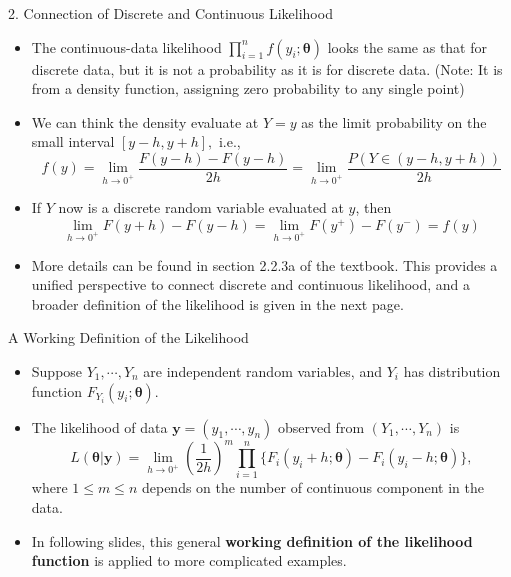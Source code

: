 \documentclass{beamer}
\begin{document}
    \begin{frame}{2. Connection of Discrete and Continuous Likelihood}
        \begin{itemize}
                \item  The continuous-data likelihood $\prod^{n}_{i=1}f(y_{i};\boldsymbol{\theta})$ looks the same as that for discrete data, but it is not a probability as it is for discrete data. (Note: It is from a density function, assigning zero probability to any single point)
                
                \item We can think the density evaluate at $Y = y$ as the limit probability on the small interval $[y - h, y + h],$ i.e.,
                $$f(y) = \lim_{h \rightarrow 0^{+}} \frac{F(y - h) - F(y - h)}{2h} = \lim_{h \rightarrow 0^{+}} \frac{P(Y \in (y - h, y + h))}{2h}$$
                \item If $Y$ now is a discrete random variable evaluated at $y$, then 
                $$\lim_{h \rightarrow 0^{+}} F(y+h) - F(y-h) = \lim_{h \rightarrow 0^{+}} F(y^{+}) - F(y^{-}) = f(y)$$
                \item More details can be found in section 2.2.3a of the textbook. This provides a unified perspective to connect discrete and continuous likelihood, and a broader definition of the likelihood is given in the next page. 
         \end{itemize}
    \end{frame}
    
    
     \begin{frame}{A Working Definition of the Likelihood}
        \begin{itemize}
            \item  Suppose $Y_{1}, \cdots, Y_{n}$ are independent random variables, and $Y_{i}$ has distribution function $F_{Y_{i}}(y_{i};\boldsymbol{\theta}).$
            \item The likelihood of data $\boldsymbol{y} = (y_{1}, \cdots, y_{n})$ observed from $(Y_{1}, \cdots, Y_{n})$ is
            \begin{equation}
            L(\boldsymbol{\theta}|\boldsymbol{y}) = \lim_{h \rightarrow 0^{+}} \left(\frac{1}{2h}\right)^{m}\prod^{n}_{i=1}\{F_{i}(y_{i}+h;\boldsymbol{\theta})-F_{i}(y_{i}-h;\boldsymbol{\theta})\}, \label{eq: working_def}
            \end{equation}
            where $1 \leq m \leq n$ depends on the number of continuous component in the data.
            \item In following slides, this general {\bf working definition of the likelihood function} is applied to more complicated examples.
        \end{itemize}
    \end{frame}
    
\end{document}
